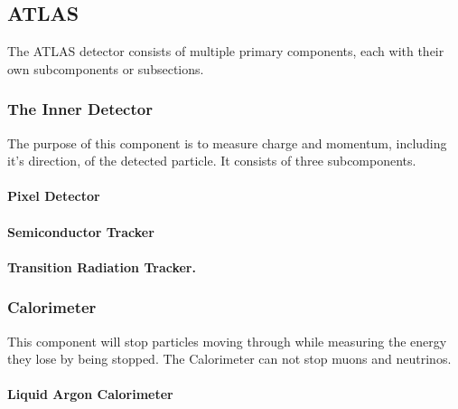 \documentclass[11pt,a4paper]{article}
\begin{document}
\subsection{ATLAS}


The ATLAS detector consists of multiple primary components, each with their own subcomponents or subsections.

\subsubsection{The Inner Detector}
The purpose of this component is to measure charge and momentum, including it's
direction, of the detected particle. It consists of three subcomponents.
\paragraph{Pixel Detector}
\paragraph{Semiconductor Tracker}
\paragraph{Transition Radiation Tracker.}

\subsubsection{Calorimeter}
This component will stop particles moving through while measuring the
energy they lose by being stopped. %
The Calorimeter can not stop muons and neutrinos.

\paragraph{Liquid Argon Calorimeter}
\end{document}
